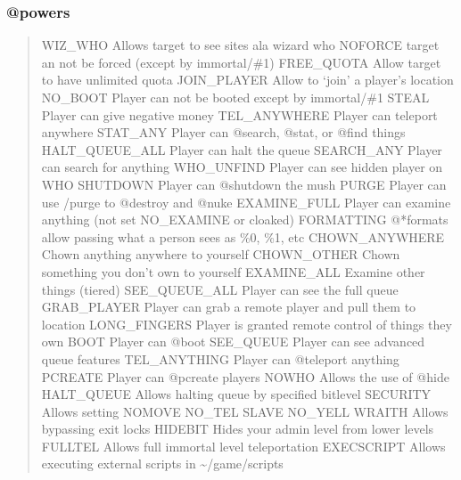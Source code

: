 \documentclass[letterpaper,10pt,english]{sphinxmanual}
\begin{document}
\subsubsection{@powers}
\label{\detokenize{security:powers}}\begin{quote}

\sphinxAtStartPar
WIZ\_WHO            \sphinxhyphen{} Allows target to see sites ala wizard who
NOFORCE            \sphinxhyphen{} target an not be forced (except by immortal/\#1)
FREE\_QUOTA         \sphinxhyphen{} Allow target to have unlimited quota
JOIN\_PLAYER        \sphinxhyphen{} Allow to ‘join’ a player’s location
NO\_BOOT            \sphinxhyphen{} Player can not be booted except by immortal/\#1
STEAL              \sphinxhyphen{} Player can give negative money
TEL\_ANYWHERE       \sphinxhyphen{} Player can teleport anywhere
STAT\_ANY           \sphinxhyphen{} Player can @search, @stat, or @find things
HALT\_QUEUE\_ALL     \sphinxhyphen{} Player can halt the queue
SEARCH\_ANY         \sphinxhyphen{} Player can search for anything
WHO\_UNFIND         \sphinxhyphen{} Player can see hidden player on WHO
SHUTDOWN           \sphinxhyphen{} Player can @shutdown the mush
PURGE              \sphinxhyphen{} Player can use /purge to @destroy and @nuke
EXAMINE\_FULL       \sphinxhyphen{} Player can examine anything (not set NO\_EXAMINE or cloaked)
FORMATTING         \sphinxhyphen{} @*formats allow passing what a person sees as \%0, \%1, etc
CHOWN\_ANYWHERE     \sphinxhyphen{} Chown anything anywhere to yourself
CHOWN\_OTHER        \sphinxhyphen{} Chown something you don’t own to yourself
EXAMINE\_ALL        \sphinxhyphen{} Examine other things (tiered)
SEE\_QUEUE\_ALL      \sphinxhyphen{} Player can see the full queue
GRAB\_PLAYER        \sphinxhyphen{} Player can grab a remote player and pull them to location
LONG\_FINGERS       \sphinxhyphen{} Player is granted remote control of things they own
BOOT               \sphinxhyphen{} Player can @boot
SEE\_QUEUE          \sphinxhyphen{} Player can see advanced queue features
TEL\_ANYTHING       \sphinxhyphen{} Player can @teleport anything
PCREATE            \sphinxhyphen{} Player can @pcreate players
NOWHO              \sphinxhyphen{} Allows the use of @hide
HALT\_QUEUE         \sphinxhyphen{} Allows halting queue by specified bitlevel
SECURITY           \sphinxhyphen{} Allows setting  NOMOVE    NO\_TEL   SLAVE   NO\_YELL
WRAITH             \sphinxhyphen{} Allows bypassing exit locks
HIDEBIT            \sphinxhyphen{} Hides your admin level from lower levels
FULLTEL            \sphinxhyphen{} Allows full immortal level teleportation
EXECSCRIPT         \sphinxhyphen{} Allows executing external scripts in \textasciitilde{}/game/scripts
\end{quote}
\end{document}
